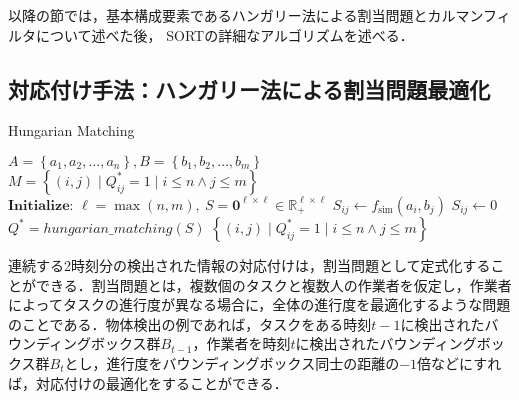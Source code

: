     以降の節では，基本構成要素であるハンガリー法による割当問題とカルマンフィルタについて述べた後， SORTの詳細なアルゴリズムを述べる．

    \subsection{対応付け手法：ハンガリー法による割当問題最適化}
    \label{subsec:hungarian_algorithm}

    \begin{algorithm}[t]
        \caption{Hungarian Matching}
        \label{alg:hungarian_matching}
        \begin{algorithmic}[1]
            \Require $A = \left\{a_1, a_2, \dots, a_n\right\}, B = \left\{b_1, b_2, \dots, b_m\right\}$
            \Ensure $M = \left\{(i, j) \mid Q^*_{ij} = 1 \mid i \leq n \land j \leq m\right\}$
            \State $\textbf{Initialize: } \ell = \max(n, m), ~ S = \bm{0}^{\ell \times \ell} \in \mathbb{R}_+^{\ell \times \ell}$
                        \State $S_{ij} \gets f_{\text{sim}}(a_i, b_j)$
                    \Else
                        \State $S_{ij} \gets 0$
                    \EndIf
                \EndFor
            \EndFor
            \State $Q^* = hungarian\_matching(S)$
            \State \Return $\left\{(i, j) \mid Q^*_{ij} = 1 \mid i \leq n \land j \leq m\right\}$
        \end{algorithmic}
    \end{algorithm}

    連続する2時刻分の検出された情報の対応付けは，割当問題として定式化することができる．割当問題とは，複数個のタスクと複数人の作業者を仮定し，作業者によってタスクの進行度が異なる場合に，全体の進行度を最適化するような問題のことである．物体検出の例であれば，タスクをある時刻$t-1$に検出されたバウンディングボックス群$B_{t-1}$，作業者を時刻$t$に検出されたバウンディングボックス群$B_{t}$とし，進行度をバウンディングボックス同士の距離の$-1$倍などにすれば，対応付けの最適化をすることができる．

